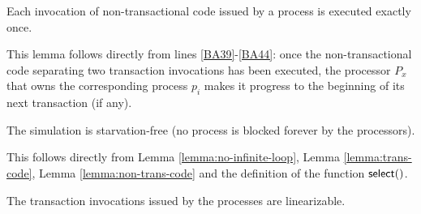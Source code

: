 \begin{lemma}
\label{lemma:non-trans-code}
Each invocation of non-transactional code issued by a process is
executed exactly once.
\end{lemma}

\begin{proofL}
This lemma  follows directly  from lines \ref{BA39}-\ref{BA44}:  once the
non-transactional  code separating two  transaction invocations  has been
executed, the processor $P_x$ that owns the corresponding process $p_i$ 
makes it progress to the beginning of its  next transaction (if any). 
\renewcommand{\toto}{lemma:non-trans-code}
\end{proofL}



\begin{lemma}
\label{lemma:process-progress}
The simulation is starvation-free (no process is blocked forever
by the processors).
\end{lemma}

\begin{proofL}
This follows directly from Lemma \ref{lemma:no-infinite-loop},
Lemma \ref{lemma:trans-code}, Lemma \ref{lemma:non-trans-code}
and the definition of the function ${\sf select}()$. 
\renewcommand{\toto}{lemma:process-progress}
\end{proofL}




\begin{lemma}
\label{lemma:trans-linearizability}
The transaction invocations issued by the processes are linearizable. 
\end{lemma}

